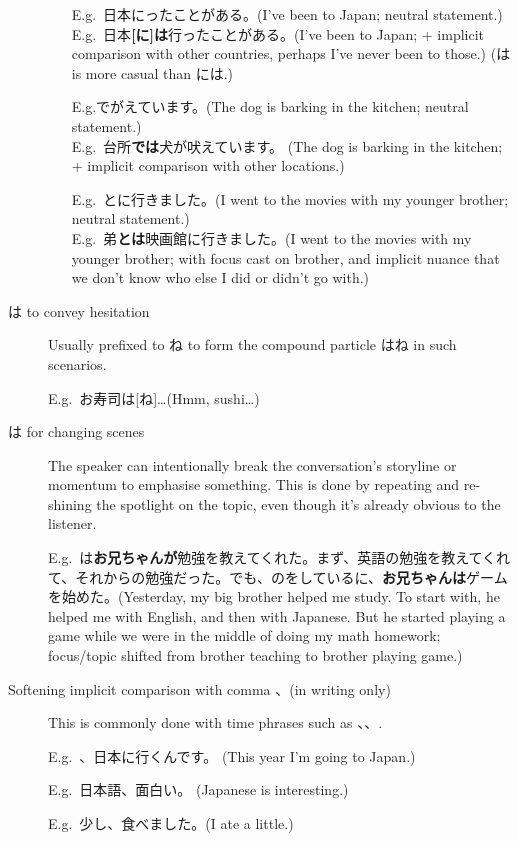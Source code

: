 \documentclass[../nihongo-gakushuu-kyouzai.tex]{subfiles}
\begin{document}
\begin{description}
\begin{itemize}
        E.g.\ 日本にったことがある。(I've been to Japan; neutral statement.)\\
        E.g.\ 日本\textbf{[に]は}行ったことがある。(I've been to Japan; + implicit comparison with other countries, perhaps I've never been to those.) (は is more casual than には.)

        E.g.でがえています。(The dog is barking in the kitchen; neutral statement.)\\
        E.g.\ 台所\textbf{では}犬が吠えています。 (The dog is barking in the kitchen; + implicit comparison with other locations.)

        E.g.\ とに行きました。(I went to the movies with my younger brother; neutral statement.)\\
        E.g.\ 弟\textbf{とは}映画館に行きました。(I went to the movies with my younger brother; with focus cast on brother, and implicit nuance that we don't know who else I did or didn't go with.)
    \end{itemize}
    \item[は to convey hesitation] Usually prefixed to ね to form the compound particle はね in such scenarios.

    E.g.\ お寿司は[ね]\dots (Hmm, sushi\dots)
    \item[は for changing scenes] The speaker can intentionally break the conversation's storyline or momentum to emphasise something. This is done by repeating and re-shining the spotlight on the topic, even though it's already obvious to the listener.

    E.g.\ は\textbf{お兄ちゃんが}勉強を教えてくれた。まず、英語の勉強を教えてくれて、それからの勉強だった。でも、のをしているに、\textbf{お兄ちゃんは}ゲームを始めた。(Yesterday, my big brother helped me study. To start with, he helped me with English, and then with Japanese. But he started playing a game while we were in the middle of doing my math homework; focus/topic shifted from brother teaching to brother playing game.)

    \item[Softening implicit comparison with comma 、(in writing only)] This is commonly done with time phrases such as 、、.%

    E.g.\ 、日本に行くんです。 (This year I'm going to Japan.)

    E.g.\ 日本語、面白い。 (Japanese is interesting.)

    E.g.\ 少し、食べました。(I ate a little.)


\end{description}
\end{document}
